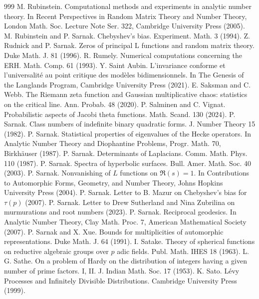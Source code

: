 \begin{thebibliography}{999}
 M. Rubinstein. Computational methods and experiments in analytic number theory. In Recent Perspectives in Random Matrix Theory and Number Theory, London Math. Soc. Lecture Note Ser. 322, Cambridge University Press (2005).
 M. Rubinstein and P. Sarnak. Chebyshev's bias. Experiment. Math. 3 (1994).
 Z. Rudnick and P. Sarnak. Zeros of principal L functions and random matrix theory. Duke Math. J. 81 (1996).
 R. Rumely. Numerical computations concerning the ERH. Math. Comp. 61 (1993).
 Y. Saint Aubin. L'invariance conforme et l'universalit\'e au point critique des mod\`eles bidimensionnels. In The Genesis of the Langlands Program, Cambridge University Press (2021).
 E. Saksman and C. Webb. The Riemann zeta function and Gaussian multiplicative chaos: statistics on the critical line. Ann. Probab. 48 (2020).
 P. Salminen and C. Vignat. Probabilistic aspects of Jacobi theta functions. Math. Scand. 130 (2024).
 P. Sarnak. Class numbers of indefinite binary quadratic forms. J. Number Theory 15 (1982).
 P. Sarnak. Statistical properties of eigenvalues of the Hecke operators. In Analytic Number Theory and Diophantine Problems, Progr. Math. 70, Birkh\"auser (1987).
 P. Sarnak. Determinants of Laplacians. Comm. Math. Phys. 110 (1987).
 P. Sarnak. Spectra of hyperbolic surfaces. Bull. Amer. Math. Soc. 40 (2003).
 P. Sarnak. Nonvanishing of $L$ functions on $\Re(s)=1$. In Contributions to Automorphic Forms, Geometry, and Number Theory, Johns Hopkins University Press (2004).
 P. Sarnak. Letter to B. Mazur on Chebyshev's bias for $\tau(p)$ (2007).
 P. Sarnak. Letter to Drew Sutherland and Nina Zubrilina on murmurations and root numbers (2023).
 P. Sarnak. Reciprocal geodesics. In Analytic Number Theory, Clay Math. Proc. 7, American Mathematical Society (2007).
 P. Sarnak and X. Xue. Bounds for multiplicities of automorphic representations. Duke Math. J. 64 (1991).
 I. Satake. Theory of spherical functions on reductive algebraic groups over $p$ adic fields. Publ. Math. IHES 18 (1963).
 L. G. Sathe. On a problem of Hardy on the distribution of integers having a given number of prime factors. I, II. J. Indian Math. Soc. 17 (1953).
 K. Sato. L\'evy Processes and Infinitely Divisible Distributions. Cambridge University Press (1999).

\end{thebibliography}
